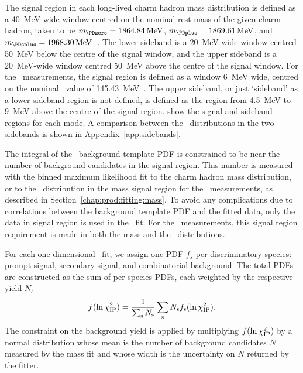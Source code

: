 The signal region in each long-lived charm hadron mass distribution is defined 
as a \SI{40}{\MeV}-wide window centred on the nominal rest mass of the given 
charm hadron, taken to be $m_{\PDzero} = \SI{1864.84}{\MeV}$, $m_{\PDplus} = 
\SI{1869.61}{MeV}$, and $m_{\PDsplus} = \SI{1968.30}{\MeV}$~\cite{PDG2014}.
The lower sideband is a \SI{20}{\MeV}-wide window centred \SI{50}{\MeV} below 
the centre of the signal window, and the upper sideband is a \SI{20}{\MeV}-wide 
window centred \SI{50}{\MeV} above the centre of the signal window.
For the \PDstarp\ measurements, the signal region is defined as a window 
\SI{6}{\MeV} wide, centred on the nominal \deltam\ value of 
\SI{145.43}{\MeV}~\cite{PDG2014}.
The upper sideband, or just `sideband' as a lower sideband region is not 
defined, is defined as the region from \SI{4.5}{\MeV} to \SI{9}{\MeV} above the 
centre of the signal region.
show the signal and sideband regions for each mode. A comparison between
the \lnipchisq\ distributions in the two sidebands is shown in 
Appendix~\ref{app:sidebands}.

The integral of the \lnipchisq\ background template \ac{PDF} is constrained to 
be near the number of background candidates in the signal region.
This number is measured with the binned maximum likelihood fit to the charm 
hadron mass distribution, or to the \deltam\ distribution in the \PDzero mass 
signal region for the \PDstarp\ measurements, as described in 
Section~\ref{chap:prod:fitting:mass}.
To avoid any complications due to correlations between the background template 
\ac{PDF} and the fitted data, only the data in signal region is used in the 
\lnipchisq\ fit.
For the \PDstarp\ measurements, this signal region requirement is made in both 
the \PDzero mass and the \deltam\ distributions.

For each one-dimensional \lnipchisq\ fit, we assign one \ac{PDF} $f_{s}$ per 
discriminatory species: prompt signal, secondary signal, and combinatorial 
background.
The total \acp{PDF} are constructed as the sum of per-species \acp{PDF}, 
each weighted by the respective yield $N_{s}$
\begin{equation}
  f(\ln\chi^2_{\textnormal{IP}}) = \frac{1}{\sum_{\textnormal{s}} N_{\textnormal{s}}}
                  \sum_{\text{s}} N_{\text{s}}
                  f_{\text{s}}(\ln\chi^2_{\textnormal{IP}}).
\end{equation}
The constraint on the background yield is applied by multiplying 
$f(\ln\chi^2_{\textnormal{IP}})$ by a normal distribution whose mean is the number of background 
candidates $N$ measured by the mass fit and whose width is the uncertainty on 
$N$ returned by the fitter.

